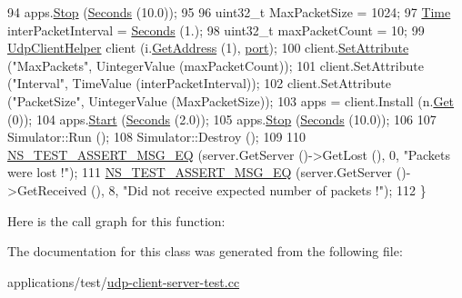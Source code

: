\begin{DoxyCode}
94   apps.\hyperlink{classns3_1_1ApplicationContainer_adfc52f9aa4020c8714679b00bbb9ddb3}{Stop} (\hyperlink{group__timecivil_ga33c34b816f8ff6628e33d5c8e9713b9e}{Seconds} (10.0));
95 
96   uint32\_t MaxPacketSize = 1024;
97   \hyperlink{classns3_1_1Time}{Time} interPacketInterval = \hyperlink{group__timecivil_ga33c34b816f8ff6628e33d5c8e9713b9e}{Seconds} (1.);
98   uint32\_t maxPacketCount = 10;
99   \hyperlink{classns3_1_1UdpClientHelper}{UdpClientHelper} client (i.\hyperlink{classns3_1_1Ipv4InterfaceContainer_ae63208dcd222be986822937ee4aa828c}{GetAddress} (1), \hyperlink{dsdv-manet_8cc_a8e0798404bf2cf5dabb84c5ba9a4f236}{port});
100   client.\hyperlink{classns3_1_1UdpClientHelper_a8bbae16a28f85ab3f3b5aa4642edfeae}{SetAttribute} (\textcolor{stringliteral}{"MaxPackets"}, UintegerValue (maxPacketCount));
101   client.SetAttribute (\textcolor{stringliteral}{"Interval"}, TimeValue (interPacketInterval));
102   client.SetAttribute (\textcolor{stringliteral}{"PacketSize"}, UintegerValue (MaxPacketSize));
103   apps = client.Install (n.\hyperlink{classns3_1_1NodeContainer_a9ed96e2ecc22e0f5a3d4842eb9bf90bf}{Get} (0));
104   apps.\hyperlink{classns3_1_1ApplicationContainer_a8eff87926507020bbe3e1390358a54a7}{Start} (\hyperlink{group__timecivil_ga33c34b816f8ff6628e33d5c8e9713b9e}{Seconds} (2.0));
105   apps.\hyperlink{classns3_1_1ApplicationContainer_adfc52f9aa4020c8714679b00bbb9ddb3}{Stop} (\hyperlink{group__timecivil_ga33c34b816f8ff6628e33d5c8e9713b9e}{Seconds} (10.0));
106 
107   Simulator::Run ();
108   Simulator::Destroy ();
109 
110   \hyperlink{group__testing_ga2a9d78cffb3db8e867c35fff0b698cf5}{NS\_TEST\_ASSERT\_MSG\_EQ} (server.GetServer ()->GetLost (), 0, \textcolor{stringliteral}{"Packets were lost !"});
111   \hyperlink{group__testing_ga2a9d78cffb3db8e867c35fff0b698cf5}{NS\_TEST\_ASSERT\_MSG\_EQ} (server.GetServer ()->GetReceived (), 8, \textcolor{stringliteral}{"Did not receive
       expected number of packets !"});
112 \}
\end{DoxyCode}


Here is the call graph for this function\+:




The documentation for this class was generated from the following file\+:\begin{DoxyCompactItemize}
\item 
applications/test/\hyperlink{udp-client-server-test_8cc}{udp-\/client-\/server-\/test.\+cc}\end{DoxyCompactItemize}
